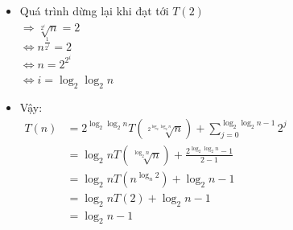\documentclass[12pt, letterpaper]{article}
\begin{document}
\begin{itemize}[label=-]
    \item Quá trình dừng lại khi đạt tới $ T(2) $ \\
        $ \Rightarrow \sqrt[2^i]{n} = 2 $ \\
        $ \Leftrightarrow n^\frac{1}{2^i} = 2 $ \\
        $ \Leftrightarrow n = 2^{2^i} $ \\
        $ \Leftrightarrow i = \log_2\log_2n $
    \item Vậy:\\
        $ \begin{aligned}
            T(n) &= 2^{\log_2\log_2n} T(\sqrt[2^{\log_2\log_2n}]{n}) + \sum_{j = 0}^{\log_2\log_2n - 1}2^j \\
            &= \log_2n T(\sqrt[\log_2n]{n}) + \frac{2^{\log_2\log_2n} - 1}{2 - 1} \\
                &= \log_2n T(n^{\log_n2}) + \log_2n - 1 \\
                &= \log_2n T(2) + \log_2n - 1 \\
                &= \log_2n - 1 \\
        \end{aligned} $
\end{itemize}
\end{document}
